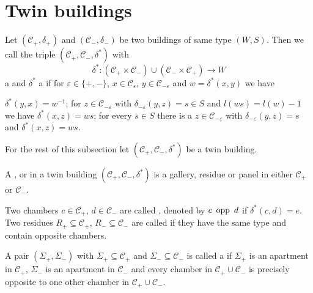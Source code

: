 \section{Twin buildings}

\begin{defi}
	Let $(\mathcal{C}_+, \delta_+)$ and $(\mathcal{C}_-, \delta_-)$ be two buildings of same type $(W,S)$. Then we call the triple $(\mathcal{C}_+,\mathcal{C}_-,\delta^*)$ with
	$$ \delta^* : (\mathcal{C}_+ \times \mathcal{C}_-) \cup (\mathcal{C}_- \times \mathcal{C}_+) \to W $$
	a  and $\delta^*$ a  if for $\varepsilon \in \{+,-\}$, $x \in \mathcal{C}_\varepsilon$, $y \in \mathcal{C}_{-\varepsilon}$ and $w = \delta^*(x,y)$ we have
	\begin{axioms}
		 $\delta^*(y,x) = w^{-1}$;
		 for $z \in \mathcal{C}_{-\varepsilon}$ with $\delta_{-\varepsilon}(y,z) = s \in S$ and $l(ws) = l(w) - 1$ we have $\delta^*(x,z) = ws$;
		 for every $s \in S$ there is a $z \in \mathcal{C}_{-\varepsilon}$ with $\delta_{-\varepsilon}(y,z) = s$ and $\delta^*(x,z) = ws$.
	\end{axioms}
\end{defi}

	For the rest of this subsection let $(\mathcal{C}_+,\mathcal{C}_-,\delta^*)$ be a twin building.

\begin{defi}
	A ,  or  in a twin building $(\mathcal{C}_+,\mathcal{C}_-,\delta^*)$ is a gallery, residue or panel in either $\mathcal{C}_+$ or $\mathcal{C}_-$.
\end{defi}

\begin{defi}
	Two chambers $c \in \mathcal{C}_+$, $d \in \mathcal{C}_-$ are called , denoted by $c \opp d$ if $\delta^*(c,d) = e$. Two residues $R_+ \subseteq \mathcal{C}_+$, $R_- \subseteq \mathcal{C}_-$ are called  if they have the same type and contain opposite chambers.
\end{defi}

\begin{defi}
	A pair $(\Sigma_+,\Sigma_-)$ with $\Sigma_+ \subseteq \mathcal{C}_+$ and $\Sigma_- \subseteq \mathcal{C}_-$ is called a  if $\Sigma_+$ is an apartment in $\mathcal{C}_+$, $\Sigma_-$ is an apartment in $\mathcal{C}_-$ and every chamber in $\mathcal C_+ \cup \mathcal C_-$ is precisely opposite to one other chamber in $\mathcal C_+ \cup \mathcal C_-$.
\end{defi}

